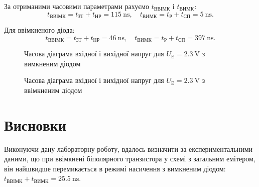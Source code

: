 \documentclass[a4paper,oneside,DIV=10,12pt]{scrartcl}
\begin{document}
		За отриманими часовими параметрами рахуємо $t_{\text{ВВІМК}}$ і $t_{\text{ВИМК}}$:
		\[
			t_{\text{ВВІМК}} = t_{\text{ЗТ}} + t_{\text{НР}} = \SI{115}{\nano\second}, \quad t_{\text{ВИМК}} = t_{\text{Р}} + t_{\text{СП}} = \SI{5}{\nano\second}.
		\]
		
		Для ввімкненого діода:
		\[
			t_{\text{ВВІМК}} = t_{\text{ЗТ}} + t_{\text{НР}} = \SI{46}{\nano\second}, \quad t_{\text{ВИМК}} = t_{\text{Р}} + t_{\text{СП}} = \SI{397}{\nano\second}.
		\]
		
		\begin{figure}[H]
		\label{fig:u2p3nodiode}
		\centering
			\def\svgwidth{\columnwidth}
			
		\caption{Часова діаграма вхідної і вихідної напруг для $U_{\text{Е}} = \SI{2,3}{\volt}$ з вимкненим діодом}
		\end{figure}
		
		
		\begin{figure}[H]
		\label{fig:u2p3diode}
		\centering
			\def\svgwidth{\columnwidth}
			
		\caption{Часова діаграма вхідної і вихідної напруг для $U_{\text{Е}} = \SI{2,3}{\volt}$ з ввімкненим діодом}
		\end{figure}
		
	\section{Висновки}
		Виконуючи дану лабораторну роботу, вдалось визначити за експериментальними даними, що при ввімкнені біполярного транзистора у схемі з загальним емітером, він найшвидше перемикається в режимі насичення з вимкненим діодом: $t_{\text{ВВІМК}} + t_{\text{ВИМК}} = \SI{25,5}{\nano\second}$.
\end{document}
